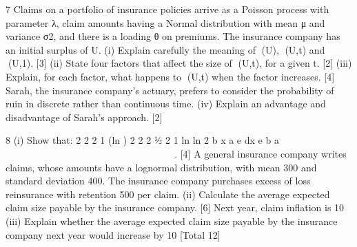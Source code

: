 \documentclass[a4paper,12pt]{article}
\begin{document}
 

7 Claims on a portfolio of insurance policies arrive as a Poisson process with parameter λ, claim amounts having a Normal distribution with mean μ and variance σ2, and there is a loading θ on premiums. The insurance company has an initial
surplus of U.
(i) Explain carefully the meaning of (U), (U,t) and (U,1). [3]
(ii) State four factors that affect the size of (U,t), for a given t. [2]
(iii) Explain, for each factor, what happens to (U,t) when the factor increases. [4]
Sarah, the insurance company’s actuary, prefers to consider the probability of ruin in discrete rather than continuous time.
(iv) Explain an advantage and disadvantage of Sarah’s approach. [2]

8 (i) Show that:
  2
2 2
1 (ln ) 2 2
2 ½
2
1 ln ln
2
b x
a
e dx e b a
 
  
           
                
 . [4]
A general insurance company writes claims, whose amounts have a lognormal
distribution, with mean 300 and standard deviation 400. The insurance company
purchases excess of loss reinsurance with retention 500 per claim.
(ii) Calculate the average expected claim size payable by the insurance
company. [6]
Next year, claim inflation is 10%
(iii) Explain whether the average expected claim size payable by the insurance
company next year would increase by 10%
[Total 12]
\end{document}
